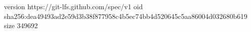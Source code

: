 version https://git-lfs.github.com/spec/v1
oid sha256:dea49493ad2e59d3b38f877958c4b5ec74bb4d520645c5aa86004d032680b619
size 349692
